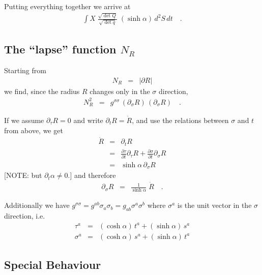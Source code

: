 Putting everything together we arrive at
\begin{eqnarray}
   \int X\; \frac{\sqrt{\det Q}}{\sqrt{\det q}}\; (\sinh \alpha)\,
   d^2S\, dt \quad\text{.}
\end{eqnarray}



\subsection{The ``lapse'' function $N_R$}

Starting from
\begin{eqnarray}
   N_R & = & | \partial R |
\end{eqnarray}
we find, since the radius $R$ changes only in the $\sigma$ direction,
\begin{eqnarray}
   N_R^2 & = & g^{\sigma\sigma}\, (\partial_\sigma R)\,
   (\partial_\sigma R) \quad\text{.}
\end{eqnarray}

If we assume $\partial_\tau R = 0$ and write $\partial_t R = \dot R$,
and use the relations between $\sigma$ and $t$ from above, we get
\begin{eqnarray}
   \dot R & = & \partial_t R
\\
   & = & \frac{\partial \tau}{\partial t} \partial_\tau R +
   \frac{\partial \sigma}{\partial t} \partial_\sigma R
\\
   & = & \sinh \alpha\, \partial_\sigma R
\end{eqnarray}
[NOTE: but $\partial_t \alpha \ne 0$.]
and therefore
\begin{eqnarray}
   \partial_\sigma R & = & \frac{1}{\sinh \alpha}\; \dot R
   \quad\text{.}
\end{eqnarray}

Additionally we have $g^{\sigma\sigma} = g^{ab} \sigma_a \sigma_b =
g_{ab} \sigma^a \sigma^b$ where $\sigma^a$ is the unit vector in the
$\sigma$ direction, i.e.\
\begin{eqnarray}
   \tau^a   & = & (\cosh \alpha)\, t^a + (\sinh \alpha)\, s^a
\\
   \sigma^a & = & (\cosh \alpha)\, s^a + (\sinh \alpha)\, t^a
\end{eqnarray}



\subsection{Special Behaviour}

